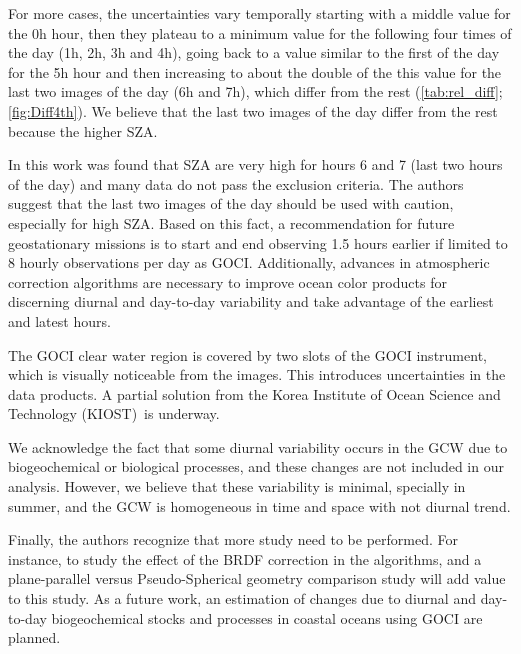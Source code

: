 \documentclass[onecolumn,3p,letterpaper,11pt]{elsarticle}
\begin{document}
For more cases, the uncertainties vary temporally starting with a middle value for the 0h hour, then they plateau to a minimum value for the following four times of the day (1h, 2h, 3h and 4h), going back to a value similar to the first of the day for the 5h hour and then increasing to about the double of the this value for the last two images of the day (6h and 7h), which differ from the rest (\autoref{tab:rel_diff};\autoref{fig:Diff4th}). We believe that the last two images of the day differ from the rest because the higher SZA.



In this work was found that SZA are very high for hours 6 and 7 (last two hours of the day) and many data do not pass the exclusion criteria. 
The authors suggest that the last two images of the day should be used with caution, especially for high SZA. 
Based on this fact, a recommendation for future geostationary missions is to start and end observing 1.5 hours earlier if limited to 8 hourly observations per day as GOCI.
Additionally, advances in atmospheric correction algorithms are necessary to improve ocean color products for discerning diurnal and day-to-day variability and take advantage of the earliest and latest hours.

The GOCI clear water region is covered by two slots of the GOCI instrument, which is visually noticeable from the images. This introduces uncertainties in the data products. A partial solution from the Korea Institute of Ocean Science and Technology (KIOST)~is underway.

We acknowledge the fact that some diurnal variability occurs in the GCW due to biogeochemical or biological processes, and these changes are not included in our analysis. However, we believe that these variability is minimal, specially in summer, and the GCW is homogeneous in time and space with not diurnal trend.

Finally, the authors recognize that more study need to be performed. For instance, to study the effect of the BRDF correction in the algorithms, and a plane-parallel versus Pseudo-Spherical geometry comparison study will add value to this study. As a future work, an estimation of changes due to diurnal and day-to-day biogeochemical stocks and processes in coastal oceans using GOCI are planned.
\end{document}
